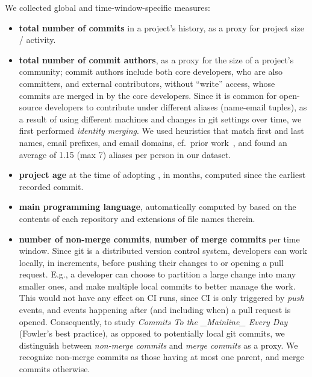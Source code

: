 We collected global and time-window-specific measures: 
\begin{itemize}

\item \textbf{total number of commits} in a project's history, as a proxy for 
project size / activity.

\item \textbf{total number of commit authors}, as a proxy for the size of a
project's community; commit authors include both core developers, who are
also committers, and external contributors, without ``write'' access, whose 
commits are merged in by the core developers.
Since it is common for open-source developers to contribute under different 
aliases (name-email tuples), \eg as a result of using different machines and 
changes in git settings over time, we first performed \emph{identity merging}.
We used heuristics that match first and last names, email prefixes, and email 
domains, cf.\ prior work~\cite{bird2006mining, vasilescu2015msrdata}, and
found an average of 1.15 (max 7) aliases per person in our dataset.

\item \textbf{project age} at the time of adopting \Tvis, in months, computed
since the earliest recorded commit.

\item \textbf{main programming language}, automatically computed by \GH
based on the contents of each repository and extensions of file names therein.

\item \textbf{number of non-merge commits}, \textbf{number of merge commits} 
per time window.
Since git is a distributed version control system, developers can work locally,
in increments, before pushing their changes to \GH or opening a pull request.
E.g., a developer can choose to partition a large change into many smaller 
ones, and make multiple local commits to better manage the work.
This would not have any effect on CI runs, since CI is only triggered by \GH 
\emph{push} events, and events happening after (and including when) a pull 
request is opened.
Consequently, to study \emph{Commits To the \_Mainline\_ Every Day}
(Fowler's best practice), as opposed to potentially local git commits, we
distinguish between \emph{non-merge commits} and \emph{merge commits}
as a proxy.
We recognize non-merge commits as those having at most one parent, and
merge commits otherwise.


\end{itemize}

